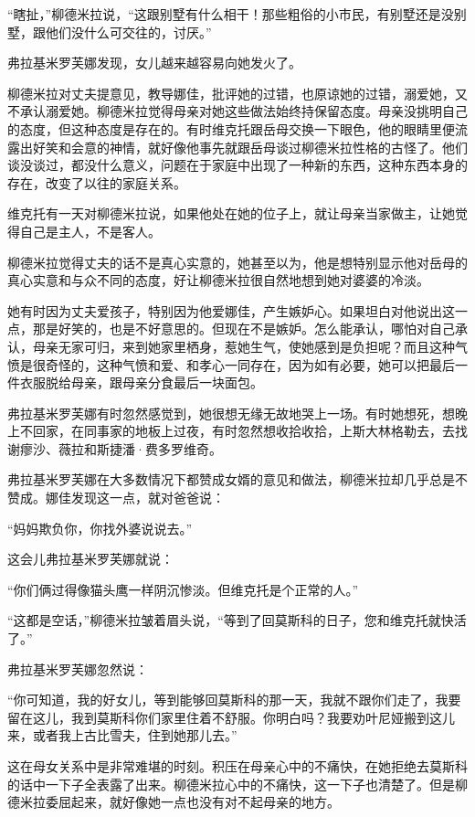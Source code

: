 “瞎扯，”柳德米拉说，“这跟别墅有什么相干！那些粗俗的小市民，有别墅还是没别墅，跟他们没什么可交往的，讨厌。”

弗拉基米罗芙娜发现，女儿越来越容易向她发火了。

柳德米拉对丈夫提意见，教导娜佳，批评她的过错，也原谅她的过错，溺爱她，又不承认溺爱她。柳德米拉觉得母亲对她这些做法始终持保留态度。母亲没挑明自己的态度，但这种态度是存在的。有时维克托跟岳母交换一下眼色，他的眼睛里便流露出好笑和会意的神情，就好像他事先就跟岳母谈过柳德米拉性格的古怪了。他们谈没谈过，都没什么意义，问题在于家庭中出现了一种新的东西，这种东西本身的存在，改变了以往的家庭关系。

维克托有一天对柳德米拉说，如果他处在她的位子上，就让母亲当家做主，让她觉得自己是主人，不是客人。

柳德米拉觉得丈夫的话不是真心实意的，她甚至以为，他是想特别显示他对岳母的真心实意和与众不同的态度，好让柳德米拉很自然地想到她对婆婆的冷淡。

她有时因为丈夫爱孩子，特别因为他爱娜佳，产生嫉妒心。如果坦白对他说出这一点，那是好笑的，也是不好意思的。但现在不是嫉妒。怎么能承认，哪怕对自己承认，母亲无家可归，来到她家里栖身，惹她生气，使她感到是负担呢？而且这种气愤是很奇怪的，这种气愤和爱、和孝心一同存在，因为如有必要，她可以把最后一件衣服脱给母亲，跟母亲分食最后一块面包。

弗拉基米罗芙娜有时忽然感觉到，她很想无缘无故地哭上一场。有时她想死，想晚上不回家，在同事家的地板上过夜，有时忽然想收拾收拾，上斯大林格勒去，去找谢瘳沙、薇拉和斯捷潘·费多罗维奇。

弗拉基米罗芙娜在大多数情况下都赞成女婿的意见和做法，柳德米拉却几乎总是不赞成。娜佳发现这一点，就对爸爸说：

“妈妈欺负你，你找外婆说说去。”

这会儿弗拉基米罗芙娜就说：

“你们俩过得像猫头鹰一样阴沉惨淡。但维克托是个正常的人。”

“这都是空话，”柳德米拉皱着眉头说，“等到了回莫斯科的日子，您和维克托就快活了。”

弗拉基米罗芙娜忽然说：

“你可知道，我的好女儿，等到能够回莫斯科的那一天，我就不跟你们走了，我要留在这儿，我到莫斯科你们家里住着不舒服。你明白吗？我要劝叶尼娅搬到这儿来，或者我上古比雪夫，住到她那儿去。”

这在母女关系中是非常难堪的时刻。积压在母亲心中的不痛快，在她拒绝去莫斯科的话中一下子全表露了出来。柳德米拉心中的不痛快，这一下子也清楚了。但是柳德米拉委屈起来，就好像她一点也没有对不起母亲的地方。

